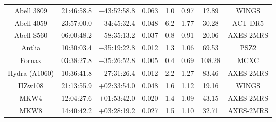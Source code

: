 \begin{table}
\begin{tabular}{cccccccc}
Abell 3809 & 21:46:58.8 & $-$43:52:58.8 & 0.063 & 1.0 & 0.97 & 12.89 & WINGS \\
Abell 4059 & 23:57:00.0 & $-$34:45:32.4 & 0.048 & 6.2 & 1.77 & 30.28 & ACT-DR5 \\
Abell S560 & 06:00:48.2 & $-$58:35:13.2 & 0.037 & 0.8 & 0.91 & 20.06 & AXES-2MRS \\
Antlia & 10:30:03.4 & $-$35:19:22.8 & 0.012 & 1.3 & 1.06 & 69.53 & PSZ2 \\
Fornax & 03:38:27.8 & $-$35:26:52.8 & 0.005 & 0.4 & 0.69 & 108.28 & MCXC \\
Hydra (A1060) & 10:36:41.8 & $-$27:31:26.4 & 0.012 & 2.2 & 1.27 & 83.46 & AXES-2MRS \\
IIZw108 & 21:13:55.9 & $+$02:33:54.0 & 0.048 & 1.6 & 1.12 & 19.16 & WINGS \\
MKW4 & 12:04:27.6 & $+$01:53:42.0 & 0.020 & 1.4 & 1.09 & 43.15 & AXES-2MRS \\
MKW8 & 14:40:42.2 & $+$03:28:19.2 & 0.027 & 1.5 & 1.10 & 32.71 & AXES-2MRS \\
\end{tabular}
\end{table}
